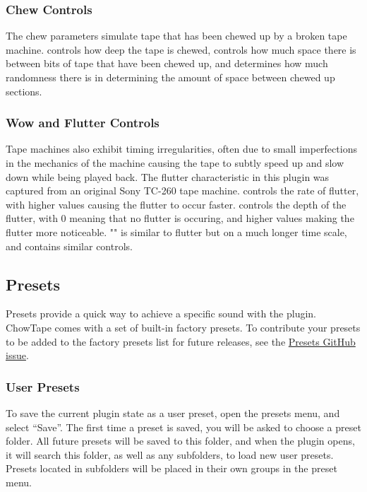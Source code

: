 \documentclass[landscape,twocolumn,a5paper]{manual}
\begin{document}
\subsubsection{Chew Controls}
The chew parameters simulate tape that has been chewed up by
a broken tape machine.  controls how deep the
tape is chewed,  controls how much space
there is between bits of tape that have been chewed up, and
 determines how much randomness there is
in determining the amount of space between chewed up sections.

\subsubsection{Wow and Flutter Controls}
Tape machines also exhibit timing irregularities, often due
to small imperfections in the mechanics of the machine causing
the tape to subtly speed up and slow down while being
played back. The flutter characteristic in this plugin was
captured from an original Sony TC-260 tape machine.
\newpar
{} controls the rate of flutter, with higher values
causing the flutter to occur faster.  controls the
depth of the flutter, with 0 meaning that no flutter is occuring, and
higher values making the flutter more noticeable.
\newpar
"" is similar to flutter but on a much longer time scale,
and contains similar controls.

\subsection{Presets}
Presets provide a quick way to achieve a specific sound
with the plugin. ChowTape comes with a set of built-in
factory presets. To contribute your presets to be added
to the factory presets list for future releases, see the
\href{https://github.com/jatinchowdhury18/AnalogTapeModel/issues/30}{Presets GitHub issue}.

\subsubsection{User Presets}
To save the current plugin state as a user preset, open
the presets menu, and select ``Save''. The first time a
preset is saved, you will be asked to choose a preset
folder. All future presets will be saved to this folder,
and when the plugin opens, it will search this folder, as
well as any subfolders, to load new user presets.
Presets located in subfolders will be placed in their
own groups in the preset menu.
\end{document}
